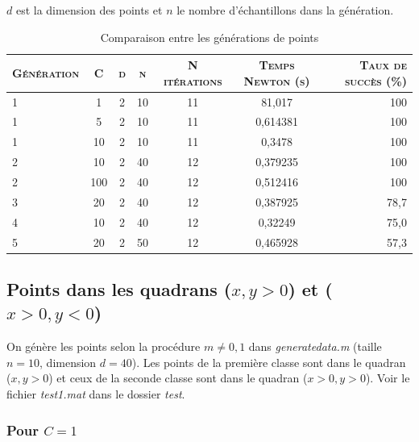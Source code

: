 \documentclass{article}
\begin{document}
$d$ est la dimension des points et $n$ le nombre d'échantillons dans la génération.\\

     \begin{table}[H]
       \caption{Comparaison entre les générations de points}
       \begin{tabular}{|l|c|c|c|c|c|r|}
         \hline
         \textsc{Génération} & \textsc{C} & \textsc{d} & \textsc{n} & \textsc{N itérations} & \textsc{Temps Newton (s)} & \textsc{Taux de succès (\%)}\\
         \hline
         1 & 1 & 2 & 10 & 11 & 81,017 & 100\\
         \hline
         1 & 5 & 2 & 10 & 11 & 0,614381 & 100\\
         \hline
         1 & 10 & 2 & 10 & 11 & 0,3478 & 100\\
         \hline
         2 & 10 & 2 & 40 & 12 & 0,379235 & 100\\
         \hline
         2 & 100 & 2 & 40 & 12 & 0,512416 & 100\\
         \hline
         3 & 20 & 2 & 40 & 12 & 0,387925 & 78,7\\
         \hline
         4 & 10 & 2 & 40 & 12 & 0,32249 & 75,0\\
         \hline
         5 & 20 & 2 & 50 & 12 & 0,465928 & 57,3\\
         \hline
       \end{tabular}
     \end{table}

\subsection{Points dans les quadrans ($x, y > 0$) et ($x > 0, y < 0$)}

On génère les points selon la procédure $m \neq 0, 1$ dans \emph{generatedata.m} (taille $n = 10$, dimension $d = 40$). Les points de la première classe sont dans le quadran ($x, y > 0$) et ceux de la seconde classe sont dans le quadran ($x > 0, y > 0$). Voir le fichier \emph{test1.mat} dans le dossier \emph{test}. 

\subsubsection{Pour $C = 1$}
\end{document}
